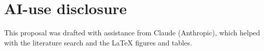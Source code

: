 \documentclass{article}
\begin{document}
{\small


}

\appendix
\section{AI-use disclosure}
This proposal was drafted with assistance from Claude (Anthropic), which helped with the literature search and the \LaTeX{} figures and tables.
\end{document}
